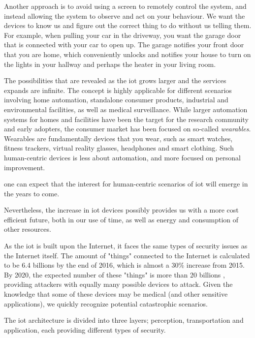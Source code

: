 Another approach is to avoid using a screen to remotely control the system, and instead allowing the system to observe and act on your behaviour. We want the devices to know us and figure out the correct thing to do without us telling them. For example, when pulling your car in the driveway, you want the garage door that is connected with your car to open up. The garage notifies your front door that you are home, which conveniently unlocks and notifies your house to turn on the lights in your hallway and perhaps the heater in your living room.




The possibilities that are revealed as the \gls{iot} grows larger and the services expands are infinite. The concept is highly applicable for different scenarios involving home automation, standalone consumer products, industrial and environmental facilities, as well as medical surveillance. While larger automation systems for homes and facilities have been the target for the research community and early adopters, the consumer market has been focused on so-called \emph{wearables}. Wearables are fundamentally devices that you wear, such as smart watches, fitness trackers, virtual reality glasses, headphones and smart clothing. Such human-centric devices is less about automation, and more focused on personal improvement.

one can expect that the interest for human-centric scenarios of \gls{iot} will emerge in the years to come.

Nevertheless, the increase in \gls{iot} devices possibly provides us with a more cost efficient future, both in our use of time, as well as energy and consumption of other resources.


As the \gls{iot} is built upon the Internet, it faces the same types of security issues as the Internet itself. The amount of "things" connected to the Internet is calculated to be 6.4 billions by the end of 2016, which is almost a 30\% increase from 2015. By 2020, the expected number of these "things" is more than 20 billions \cite{iot-gartner}, providing attackers with equally many possible devices to attack. Given the knowledge that some of these devices may be medical (and other sensitive applications), we quickly recognize potential catastrophic scenarios.


The \gls{iot} architecture is divided into three layers; perception, transportation and application, each providing different types of security.

